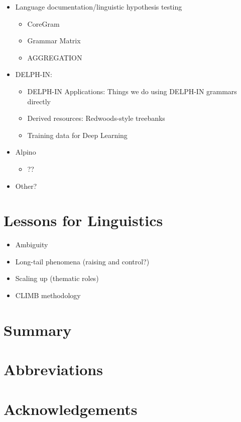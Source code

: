 \documentclass[output=paper]{langsci/langscibook}
\begin{document}
\begin{itemize}
 \item Language documentation/linguistic hypothesis testing
    \begin{itemize}
    \item CoreGram %
    \item Grammar Matrix %
    \item AGGREGATION %
    \end{itemize}
 \item DELPH-IN:
    \begin{itemize}
    \item DELPH-IN Applications: Things we do using DELPH-IN grammars directly %
    \item Derived resources: Redwoods-style treebanks %
    \item Training data for Deep Learning %
    \end{itemize}
 \item Alpino %
    \begin{itemize}
    \item ??
    \end{itemize}
 \item Other?
 \end{itemize}

\section{Lessons for Linguistics}
\begin{itemize}
    \item Ambiguity %
    \item Long-tail phenomena (raising and control?) %
    \item Scaling up (thematic roles) %
    \item CLIMB methodology %
\end{itemize}

\section{Summary}

\section*{Abbreviations}
\section*{Acknowledgements}

\printbibliography[heading=subbibliography,notkeyword=this] 
\end{document}
